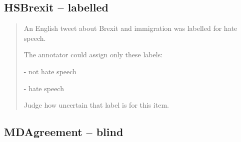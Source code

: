 \subsection*{HSBrexit -- labelled}
\begin{quote}\small
An English tweet about Brexit and immigration was labelled for hate speech.

The annotator could assign only these labels:

- not hate speech

- hate speech



Judge how uncertain that label is for this item.
\end{quote}
\subsection*{MDAgreement -- blind}
